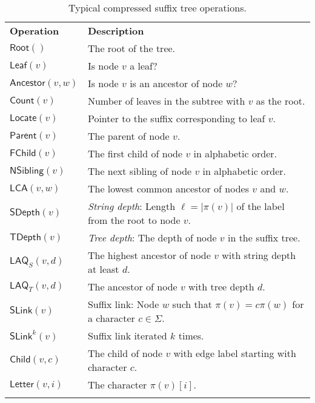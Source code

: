 \documentclass[a4paper,11pt]{llncs}
\newcommand{\abs}[1]{\ensuremath{\lvert #1 \rvert}}
\newcommand{\mRoot}{\ensuremath{\mathsf{Root}}}
\newcommand{\mLeaf}{\ensuremath{\mathsf{Leaf}}}
\newcommand{\mAncestor}{\ensuremath{\mathsf{Ancestor}}}
\newcommand{\mCount}{\ensuremath{\mathsf{Count}}}
\newcommand{\mLocate}{\ensuremath{\mathsf{Locate}}}
\newcommand{\mParent}{\ensuremath{\mathsf{Parent}}}
\newcommand{\mFChild}{\ensuremath{\mathsf{FChild}}}
\newcommand{\mNSibling}{\ensuremath{\mathsf{NSibling}}}
\newcommand{\mLCA}{\ensuremath{\mathsf{LCA}}}
\newcommand{\mSDepth}{\ensuremath{\mathsf{SDepth}}}
\newcommand{\mTDepth}{\ensuremath{\mathsf{TDepth}}}
\newcommand{\mLAQ}{\ensuremath{\mathsf{LAQ}}}
\newcommand{\mSLink}{\ensuremath{\mathsf{SLink}}}
\newcommand{\mChild}{\ensuremath{\mathsf{Child}}}
\newcommand{\mLetter}{\ensuremath{\mathsf{Letter}}}
\begin{document}
\begin{table}
\centering{}
\caption{Typical compressed suffix tree operations.}\label{table:cst operations}

\begin{tabular}{ll}
\hline
\noalign{\smallskip}
\textbf{Operation}  & \textbf{Description} \\
\noalign{\smallskip}
\hline
\noalign{\smallskip}
$\mRoot()$          & The root of the tree. \\
$\mLeaf(v)$         & Is node $v$ a leaf? \\
$\mAncestor(v,w)$   & Is node $v$ is an ancestor of node $w$? \\
\noalign{\smallskip}
$\mCount(v)$        & Number of leaves in the subtree with $v$ as the root. \\
$\mLocate(v)$       & Pointer to the suffix corresponding to leaf $v$. \\
\noalign{\smallskip}
$\mParent(v)$       & The parent of node $v$. \\
$\mFChild(v)$       & The first child of node $v$ in alphabetic order. \\
$\mNSibling(v)$     & The next sibling of node $v$ in alphabetic order. \\
$\mLCA(v,w)$        & The lowest common ancestor of nodes $v$ and $w$. \\
\noalign{\smallskip}
$\mSDepth(v)$       & \emph{String depth}: Length $\ell = \abs{\pi(v)}$ of the label from the root to node $v$. \\
$\mTDepth(v)$       & \emph{Tree depth}: The depth of node $v$ in the suffix tree. \\
$\mLAQ_{S}(v,d)$    & The highest ancestor of node $v$ with string depth at least $d$. \\
$\mLAQ_{T}(v,d)$    & The ancestor of node $v$ with tree depth $d$. \\
\noalign{\smallskip}
$\mSLink(v)$        & Suffix link: Node $w$ such that $\pi(v) = c \pi(w)$ for a character $c \in \Sigma$. \\
$\mSLink^{k}(v)$    & Suffix link iterated $k$ times. \\
\noalign{\smallskip}
$\mChild(v,c)$      & The child of node $v$ with edge label starting with character $c$. \\
$\mLetter(v,i)$     & The character $\pi(v)[i]$. \\
\noalign{\smallskip}
\hline
\end{tabular}
\end{table}
\end{document}

